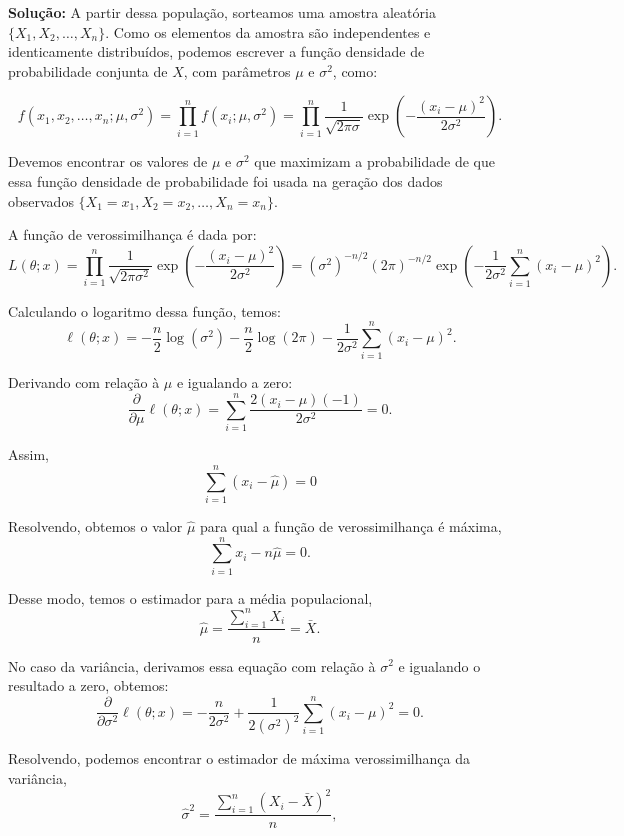 \documentclass{article}
\begin{document}
\vspace{0.5cm}
\textbf{Solução:} 
A partir dessa população, sorteamos uma amostra aleatória $\{X_1, X_2, \ldots, X_n\}$. Como os elementos da amostra são independentes e identicamente distribuídos, podemos escrever a função densidade de probabilidade conjunta de $X$, com parâmetros $\mu$ e $\sigma^2$, como:

    $$
    f(x_1, x_2, \ldots, x_n; \mu, \sigma^2) = \prod_{i=1}^n f(x_i; \mu, \sigma^2)
    = \prod_{i=1}^n \frac{1}{\sqrt{2\pi\sigma}} 
    \exp\left(-\frac{(x_i - \mu)^2}{2\sigma^2}\right).
    $$

Devemos encontrar os valores de $\mu$ e $\sigma^2$ que maximizam a probabilidade de que essa função densidade de probabilidade foi usada na geração dos dados observados 
    $\{X_1 = x_1, X_2 = x_2, \ldots, X_n = x_n\}$.

A função de verossimilhança é dada por:
    $$
    L(\theta; x) = 
    \prod_{i=1}^n 
    \frac{1}{\sqrt{2\pi\sigma^2}}
    \exp\left(-\frac{(x_i - \mu)^2}{2\sigma^2}\right)
    = 
    (\sigma^2)^{-n/2} (2\pi)^{-n/2} 
    \exp\left(
    -\frac{1}{2\sigma^2}
    \sum_{i=1}^n (x_i - \mu)^2
    \right).
    $$

Calculando o logaritmo dessa função, temos:
    $$
    \ell(\theta; x) = 
    -\frac{n}{2}\log(\sigma^2) 
    -\frac{n}{2}\log(2\pi) 
    -\frac{1}{2\sigma^2}
    \sum_{i=1}^n (x_i - \mu)^2.
    $$

Derivando com relação à $\mu$ e igualando a zero:
    $$
    \frac{\partial}{\partial \mu} 
    \ell(\theta; x) = 
    \sum_{i=1}^n 
    \frac{2(x_i - \mu)(-1)}{2\sigma^2}
    = 0.
    $$

Assim,
    $$
    \sum_{i=1}^n (x_i - \hat{\mu}) = 0
    $$

Resolvendo, obtemos o valor $\hat{\mu}$ para qual a função de verossimilhança é máxima,
    $$
    \sum_{i=1}^n x_i - n\hat{\mu} = 0.
    $$

Desse modo, temos o estimador para a média populacional,
    $$
    \hat{\mu} = \frac{\sum_{i=1}^n X_i}{n} = \bar{X}.
    $$

No caso da variância, derivamos essa equação com relação à $\sigma^2$ e igualando o resultado a zero, obtemos:
    $$
    \frac{\partial}{\partial \sigma^2} 
    \ell(\theta; x) = 
    -\frac{n}{2\sigma^2} 
    + 
    \frac{1}{2(\sigma^2)^2}
    \sum_{i=1}^n (x_i - \mu)^2
    = 0.
    $$

Resolvendo, podemos encontrar o estimador de máxima verossimilhança da variância,
    $$
    \hat{\sigma}^2 
    = 
    \frac{\sum_{i=1}^n (X_i - \bar{X})^2}{n},
    $$
\end{document}
